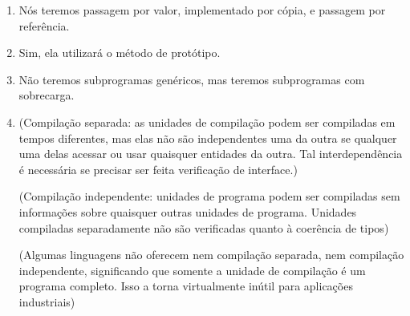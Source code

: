 \documentclass[12pt, a4paper]{article}
\begin{document}
\begin{enumerate}
        \item
        Nós teremos passagem por valor, implementado por cópia, e passagem por referência.

        \item
        Sim, ela utilizará o método de protótipo.

        \item
        Não teremos subprogramas genéricos, mas teremos subprogramas com sobrecarga.

        \begin{comment}
            Com sobrecarga:
            int soma(int a, int b) {
                return a+b;
            }

            float soma(float a, float b) {
                return a+b;
            }

            int soma(String a, String b) {
                return a^b;
            }

            Final das contas, posso lembrar o nome de apenas uma função e fazer:

            soma(1, 2);
            soma(1.5, 2.5);
            soma(“teste”, “ ftw”);

            Sem sobrecarga:

            int somaInt(int a, int b) {
                return a+b;
            }

            float somaFloat(float a, float b) {
                return a+b;
            }

            int somaString(String a, String b) {
                return a^b;
            }
        \end{comment}

        \item
        (Compilação separada: as unidades de compilação podem ser compiladas em
        tempos diferentes, mas elas não são independentes uma da outra se
        qualquer uma delas acessar ou usar quaisquer entidades da outra. Tal
        interdependência é necessária se precisar ser feita verificação de
        interface.)

        (Compilação independente: unidades de programa podem ser compiladas sem
        informações sobre quaisquer outras unidades de programa. Unidades
        compiladas separadamente não são verificadas quanto à coerência de
        tipos)

        (Algumas linguagens não oferecem nem compilação separada, nem
        compilação independente, significando que somente a unidade de
        compilação é um programa completo. Isso a torna virtualmente inútil
        para aplicações industriais)
		

\end{enumerate}
\end{document}
